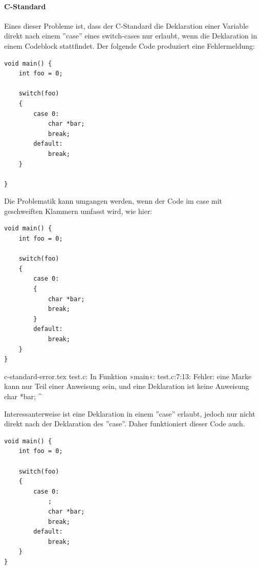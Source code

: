 \paragraph{C-Standard}
Eines dieser Probleme ist, dass der C-Standard die Deklaration einer Variable
direkt nach einem ''case'' eines switch-cases nur erlaubt, wenn die Deklaration
in einem Codeblock stattfindet.
Der folgende Code produziert eine Fehlermeldung:
\begin{lstlisting}[caption=Problematik mit C-Standard,label=c-standard]
void main() {
    int foo = 0;
    
    switch(foo)
    {
        case 0:
            char *bar;
            break;
        default:
            break;
    }

}
\end{lstlisting}
Die Problematik kann umgangen werden, wenn der Code im case mit geschweiften Klammern
umfasst wird, wie hier:
\begin{lstlisting}[caption=Abhilfe für Problematik mit C-Standard,label=c-standard-fix]
void main() {
    int foo = 0;
    
    switch(foo)
    {
        case 0:
        {
            char *bar;
            break;
        }
        default:
            break;
    }
}
\end{lstlisting}
\begin{filecontents*}{c-standard-error.tex}
test.c: In Funktion »main«:
test.c:7:13: Fehler: eine Marke kann nur Teil einer Anweisung sein, und eine Deklaration ist keine Anweisung
             char *bar;
             ^~~~
\end{filecontents*}



Interessanterweise ist eine Deklaration in einem ''case'' erlaubt, jedoch nur
nicht direkt nach der Deklaration des ''case''.
Daher funktioniert dieser Code auch.

\begin{lstlisting}[caption=Abhilfe mittels NOOP,label=c-standard-noop]
void main() {
    int foo = 0;
    
    switch(foo)
    {
        case 0:
            ;
            char *bar;
            break;
        default:
            break;
    }
}

\end{lstlisting}
